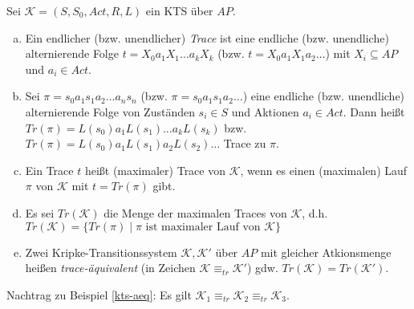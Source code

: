 \begin{defn}[Traces]
	Sei $\mathcal{K} = (S, S_0, \textit{Act}, R, L)$ ein KTS über $AP$.
	
	\begin{enumerate}[a)]
		\item Ein endlicher (bzw. unendlicher) \emph{Trace} ist eine endliche (bzw. unendliche) alternierende Folge $t=X_0 a_1 X_1 \dots a_k X_k$ (bzw. $t=X_0 a_1 X_1 a_2 \dots$) mit $X_i \subseteq \textit{AP}$ und $a_i \in \textit{Act}$.
		
		\item Sei  $\pi = s_0 a_1 s_1 a_2 \dots a_n s_n$ (bzw. $\pi = s_0 a_1 s_1 a_2 \dots $) eine endliche (bzw. unendliche) alternierende Folge von Zuständen $s_i \in S$ und Aktionen $a_i \in \textit{Act}$. Dann heißt $Tr(\pi) = L(s_0) a_1 L(s_1) \dots a_k L(s_k)$ bzw. $Tr(\pi) = L(s_0) a_1 L(s_1) a_2 L(s_2) \dots$ Trace zu $\pi$.
		
		\item Ein Trace $t$ heißt (maximaler) Trace von $\mathcal{K}$, wenn es einen (maximalen) Lauf $\pi$ von $\mathcal{K}$ mit $t=Tr(\pi)$ gibt.
		
		\item[] Es sei $Tr(\mathcal{K})$ die Menge der maximalen Traces von $\mathcal{K}$, d.h. $Tr(\mathcal{K}) = \{Tr(\pi) \mid \pi \text{ ist maximaler Lauf von } \mathcal{K}\}$
		
		\item Zwei Kripke-Transitionssystem $\mathcal{K}, \mathcal{K}'$ über $AP$ mit gleicher Atkionsmenge heißen \emph{trace-äquivalent} (in Zeichen $\mathcal{K} \equiv_{tr} \mathcal{K}'$) gdw. $Tr(\mathcal{K}) = Tr(\mathcal{K'})$.
	\end{enumerate}
\end{defn}

Nachtrag zu Beispiel \ref{kts-aeq}: Es gilt $\mathcal{K}_1 \equiv_{tr} \mathcal{K}_2 \equiv_{tr} \mathcal{K}_3$. 

\cleardoubleoddemptypage